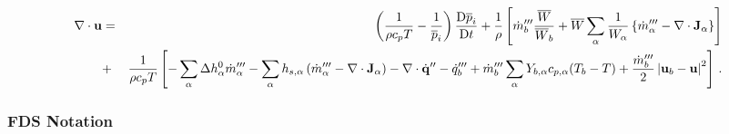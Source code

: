 \documentclass[11pt]{book}
\begin{document}
\begin{eqnarray}
\label{eqn_divconstraint_final}
\Div\mathbf{u}  &=& \left(\frac{1}{\rho c_p T}  -  \frac{1}{\overline{p}_i}\right) \frac{\mbox{D}\overline{p}_i}{\mbox{D} t} + \frac{1}{\rho} \left[ \dot{m}_b^{\tripleprime} \frac{\overline{W}}{\overline{W}_b} +  \overline{W}\sum_\alpha \frac{1}{W_\alpha} \left\{  \dot{m}_\alpha^{\tripleprime}
- \Div\mathbf{J}_{\alpha} \right\} \right] \nonumber \vspace{0.3cm}\\
&+&  \frac{1}{\rho c_p T} \left[ - \sum_\alpha \Delta h^0_\alpha \dot{m}_\alpha^{\tripleprime} - \sum_\alpha h_{s,\alpha}\left(  \dot{m}_\alpha^{\tripleprime} - \Div \mathbf{J}_{\alpha} \right) - \Div \dot{\mathbf{q}}^{\prime\prime} -\dq_b''' + \dot{m}_{b}^{\tripleprime} \sum_\alpha Y_{b,\alpha} c_{p,\alpha}(T_b-T) + \frac{\dot{m}_{b}^{\tripleprime}}{2}\left|\mathbf{u}_b-\mathbf{u}\right|^2 \right] \,\mbox{.} \nonumber \vspace{0.3cm}\\
\end{eqnarray}


\subsubsection{FDS Notation}
\label{fds_notation}
\end{document}
